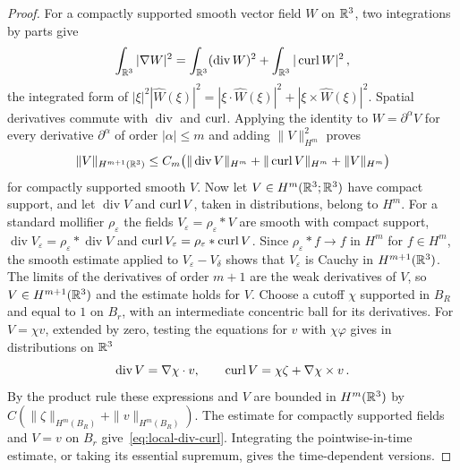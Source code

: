\documentclass[11pt,letterpaper]{article}
\numberwithin{equation}{section}
\theoremstyle{plain}
\theoremstyle{definition}
\theoremstyle{remark}
\begin{document}
\begin{proof}
For a compactly supported smooth vector field $W$ on $\mathbb{R}^3$, two integrations by parts give
\[
 \int_{\mathbb{R}^3}|\nabla W|^2
 =\int_{\mathbb{R}^3}(\operatorname{div}W)^2+\int_{\mathbb{R}^3}|\operatorname{curl} W|^2\,,
\]
the integrated form of $|\xi|^2|\widehat W(\xi)|^2=|\xi\cdot\widehat W(\xi)|^2+|\xi\times\widehat W(\xi)|^2$. Spatial derivatives commute with $\operatorname{div}$ and $\operatorname{curl}$. Applying the identity to $W=\partial^\alpha V$ for every derivative $\partial^\alpha$ of order $|\alpha|\le m$ and adding $\|V\|_{H^m}^2$ proves
\[
 \|V\|_{H^{m+1}(\mathbb{R}^3)}
 \le C_m\big(\|\operatorname{div}V\|_{H^m}
          +\|\operatorname{curl} V\|_{H^m}+\|V\|_{H^m}\big)
\]
for compactly supported smooth $V$. Now let $V\in H^m(\mathbb{R}^3;\mathbb{R}^3)$ have compact support, and let $\operatorname{div}V$ and $\operatorname{curl} V$, taken in distributions, belong to $H^m$. For a standard mollifier $\rho_\varepsilon$ the fields $V_\varepsilon=\rho_\varepsilon\ast V$ are smooth with compact support, $\operatorname{div}V_\varepsilon=\rho_\varepsilon\ast\operatorname{div}V$ and $\operatorname{curl} V_\varepsilon=\rho_\varepsilon\ast\operatorname{curl} V$. Since $\rho_\varepsilon\ast f\to f$ in $H^m$ for $f\in H^m$, the smooth estimate applied to $V_\varepsilon-V_\delta$ shows that $V_\varepsilon$ is Cauchy in $H^{m+1}(\mathbb{R}^3)$. The limits of the derivatives of order $m+1$ are the weak derivatives of $V$, so $V\in H^{m+1}(\mathbb{R}^3)$ and the estimate holds for $V$. Choose a cutoff $\chi$ supported in $B_R$ and equal to $1$ on $B_r$, with an intermediate concentric ball for its derivatives. For $V=\chi v$, extended by zero, testing the equations for $v$ with $\chi\varphi$ gives in distributions on $\mathbb{R}^3$
\[
 \operatorname{div}V=\nabla\chi\cdot v,
 \qquad \operatorname{curl} V=\chi\zeta+\nabla\chi\times v\,.
\]
By the product rule these expressions and $V$ are bounded in $H^m(\mathbb{R}^3)$ by $C(\|\zeta\|_{H^m(B_R)}+\|v\|_{H^m(B_R)})$. The estimate for compactly supported fields and $V=v$ on $B_r$ give~\eqref{eq:local-div-curl}. Integrating the pointwise-in-time estimate, or taking its essential supremum, gives the time-dependent versions.


\end{proof}
\end{document}
